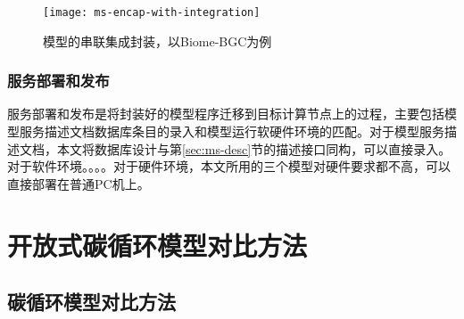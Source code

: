 \begin{figure}[!htbp]
    \centering
    \texttt{[image: ms-encap-with-integration]}
    \caption{模型的串联集成封装，以Biome-BGC为例}
    \label{fig:ms-encap-with-integration}
\end{figure}

\subsubsection{服务部署和发布}
服务部署和发布是将封装好的模型程序迁移到目标计算节点上的过程，主要包括模型服务描述文档数据库条目的录入和模型运行软硬件环境的匹配。对于模型服务描述文档，本文将数据库设计与第\ref{sec:ms-desc}节的描述接口同构，可以直接录入。对于软件环境。。。。对于硬件环境，本文所用的三个模型对硬件要求都不高，可以直接部署在普通PC机上。

\section{开放式碳循环模型对比方法}

\subsection{碳循环模型对比方法}
